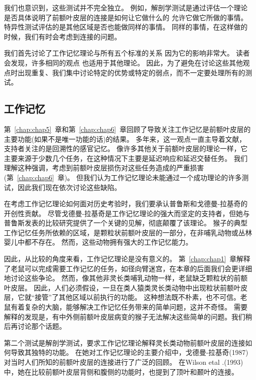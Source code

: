 我们也意识到，这些测试并不完全独立。
例如，解剖学测试是通过评估一个理论是否具体说明了前额叶皮层的连接是如何让它做什么的 允许它做它所做的事情。
特异性测试评估的是其他区域是否也能做同样的事情。
同样的事情，在这样做的时候，我们有时会考虑到连接的问题。
\par


我们首先讨论了工作记忆理论与所有五个标准的关系 因为它的影响非常大。
读者会发现，许多相同的观点 也适用于其他理论。
因此，为了避免在讨论这些其他观点时出现重复、我们集中讨论特定的优势或特定的弱点，而不一定要处理所有的测试。



\subsection{工作记忆}

第~\ref{chap:chap5}~章和第~\ref{chap:chap6}~章回顾了导致关注工作记忆是前额叶皮层的主要功能(如果不是唯一功能的话)的结果\cite{goldman2011circuitry}。
多年来，这一观点一直主导着文献，支持者关注的是回溯性的感官记忆。
像许多其他关于前额叶皮层的理论一样，它主要来源于少数几个任务，在这种情况下主要是延迟响应和延迟交替任务。
我们理解这种强调，考虑到前额叶皮层损伤对这些任务造成的严重损害(第~\ref{chap:chap6}~章)。
但我们认为工作记忆理论未能通过一个成功理论的许多测试，因此我们现在依次讨论这些缺陷。
\par


在考虑工作记忆理论如何面对历史考验时，我们要承认普鲁斯和戈德曼-拉基奇\cite{preuss1991myelo,preuss1991ipsilateral}的开创性贡献。
尽管戈德曼-拉基奇是工作记忆理论的强大而坚定的支持者，但她与普鲁斯发表的比较研究提供了一个关键的见解，彻底颠覆了该理论。
猴子的典型工作记忆任务所依赖的区域，是颗粒状前额叶皮层的一部分，在非哺乳动物或丛林婴儿中都不存在。
然而，这些动物拥有强大的工作记忆能力。
\par


因此，从比较的角度来看，工作记忆理论是没有意义的。
第~\ref{chap:chap1}~章解释了老鼠可以完成需要工作记忆的任务，如径向臂迷宫，在本章的后面我们会更详细地讨论这些争论。
然而，像其他非灵长类哺乳动物一样，老鼠缺乏颗粒状的前额叶皮层。
因此，人们必须假设，一旦在类人猿类灵长类动物中出现粒状前额叶皮层，它就“接管”了其他区域以前执行的功能。
这种想法既不朴素，也不可信。老鼠有着复杂的大脑，能够解决工作记忆任务带来的简单问题，这并不奇怪。
需要解释的发现是，有中外侧前额叶皮层病变的猴子无法解决这些简单的问题。我们稍后再讨论那个话题。
\par


第二个测试是解剖学测试，要求工作记忆理论解释灵长类动物前额叶皮层的连接如何导致其独特的功能。
在她对工作记忆理论的主要介绍中，戈德曼-拉基奇(1987)对当时人们所知的前额叶皮层的连接进行了广泛的回顾。
在Wilson etal .(1993)中，她在比较前额叶皮层背侧和腹侧的功能时，也提到了顶叶和颞叶的连接。
\par


